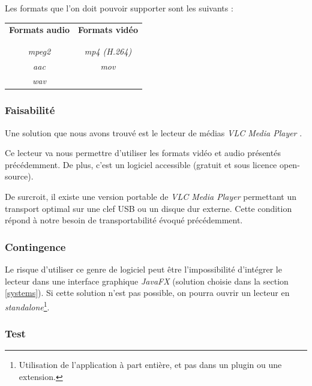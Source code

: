 Les formats que l’on doit pouvoir supporter sont les suivants :\\

\begin{center}
\begin{tabular}{c|c}
\textbf{Formats audio} & \textbf{Formats vidéo} \\
\\
\hline
\\
\textit{mpeg2} & \textit{mp4 (H.264)}\\
\textit{aac} & \textit{mov}\\
\textit{wav} & ~
\end{tabular}
\end{center}
\vspace{0.6cm}

\subsubsection{Faisabilité}

Une solution que nous avons trouvé est le lecteur de médias \textit{VLC Media Player} \cite{solutions2006vlc}.

Ce lecteur va nous permettre d'utiliser les formats vidéo et audio présentés précédemment. De plus, c'est un logiciel accessible (gratuit et sous licence open-source).

De surcroit, il existe une version portable de \textit{VLC Media Player} permettant un transport optimal sur une clef USB ou un disque dur externe. Cette condition répond à notre besoin de transportabilité évoqué précédemment.

\subsubsection{Contingence}

Le risque d’utiliser ce genre de logiciel peut être l'impossibilité d'intégrer le lecteur dans une interface graphique \textit{JavaFX} (solution choisie dans la section \ref{systems}). Si cette solution n’est pas possible, on pourra ouvrir un lecteur en \textit{standalone}\footnote{Utilisation de l'application à part entière, et pas dans un plugin ou une extension.}.

\subsubsection{Test}

